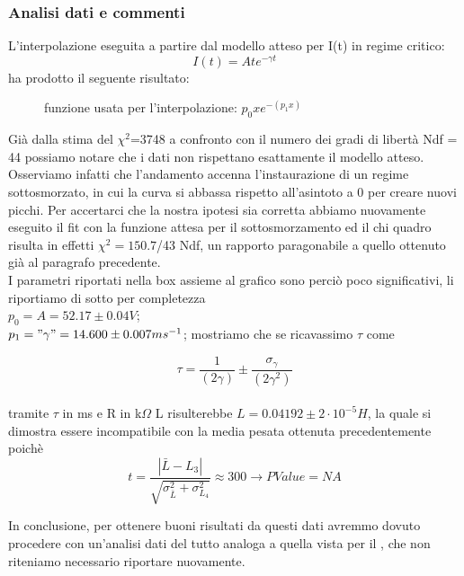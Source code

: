 \documentclass[a4paper]{article}
\theoremstyle{definition}
\begin{document}
\subsubsection*{Analisi dati e commenti}
L'interpolazione eseguita a partire dal modello atteso per I(t) in regime critico:
\[I(t)= At e^{-\gamma t}\]
ha prodotto il seguente risultato:


\begin{figure}[!ht]

	\caption{funzione usata per l'interpolazione:  \(p_{0}xe^{-(p_{1}x)}\) }

    \label{fig:critico}

\end{figure}

\noindent Già dalla stima del \(\chi^{2}\)=3748 a confronto con il numero dei gradi di libertà Ndf = 44 possiamo notare che i dati non rispettano esattamente il modello atteso. Osserviamo infatti che l'andamento accenna l'instaurazione di un regime sottosmorzato, in cui la curva si abbassa rispetto all'asintoto a 0 per creare nuovi picchi. Per accertarci che la nostra ipotesi sia corretta abbiamo nuovamente eseguito il fit con la funzione attesa per il sottosmorzamento ed il chi quadro risulta in effetti \(\chi^{2} = 150.7\)/43 Ndf, un rapporto paragonabile a quello ottenuto già al paragrafo precedente. \\

\noindent I parametri riportati nella box assieme al grafico sono perciò poco significativi, li riportiamo di sotto per completezza \\

\(p_{0} = A = 52.17 \pm  0.04V \); \\

\(p_{1}  = "\gamma" = 14.600 \pm  0.007ms^{-1}\); mostriamo che se ricavassimo \(\tau\) come
  
\[\tau = \frac{1}{(2\gamma)} \pm \frac{\sigma_{\gamma}}{(2\gamma^ {2})}\] \\
tramite \(\tau\) in ms e R in k\(\Omega\) L risulterebbe \( L = 0.04192 \pm 2 \cdot 10^{-5} H\), la quale si dimostra essere incompatibile con la media pesata ottenuta precedentemente poichè
\[t = \frac{\left| \bar{L} - L_{3} \right|}{\sqrt{\sigma^{2}_{\bar{L}} + \sigma^{2}_{L_{4}}}} \approx 300 \rightarrow PValue = NA\]

\noindent In conclusione, per ottenere buoni risultati da questi dati avremmo dovuto procedere con un'analisi dati del tutto analoga a quella vista per il , che non riteniamo necessario riportare nuovamente. 
\end{document}
